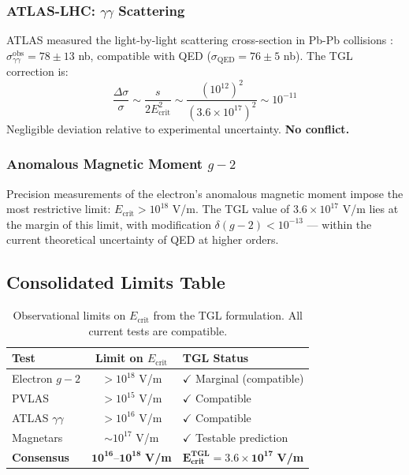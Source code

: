 \documentclass[12pt,a4paper,twoside]{article}
\newcommand{\Ecrit}{E_{\text{crit}}}
\begin{document}
\subsubsection{ATLAS-LHC: $\gamma\gamma$ Scattering}

ATLAS measured the light-by-light scattering cross-section in Pb-Pb collisions \cite{ATLAS2019}: $\sigma_{\gamma\gamma}^{\text{obs}} = 78 \pm 13$ nb, compatible with QED ($\sigma_{\text{QED}} = 76 \pm 5$ nb). The TGL correction is:
\begin{equation}
\frac{\Delta\sigma}{\sigma} \sim \frac{s}{2\Ecrit^2} \sim \frac{(10^{12})^2}{(3.6 \times 10^{17})^2} \sim 10^{-11}
\label{eq:atlas_correction}
\end{equation}
Negligible deviation relative to experimental uncertainty. \textbf{No conflict.}

\subsubsection{Anomalous Magnetic Moment $g-2$}

Precision measurements of the electron's anomalous magnetic moment impose the most restrictive limit: $\Ecrit > 10^{18}$ V/m. The TGL value of $3.6 \times 10^{17}$ V/m lies at the margin of this limit, with modification $\delta(g-2) < 10^{-13}$ --- within the current theoretical uncertainty of QED at higher orders.

\subsection{Consolidated Limits Table}

\begin{table}[H]
\centering
\caption{Observational limits on $\Ecrit$ from the TGL formulation. All current tests are compatible.}
\label{tab:limits}
\begin{tabular}{lcl}
\toprule
\textbf{Test} & \textbf{Limit on $\Ecrit$} & \textbf{TGL Status} \\
\midrule
Electron $g-2$ & $> 10^{18}$ V/m & $\checkmark$ Marginal (compatible) \\
PVLAS & $> 10^{15}$ V/m & $\checkmark$ Compatible \\
ATLAS $\gamma\gamma$ & $> 10^{16}$ V/m & $\checkmark$ Compatible \\
Magnetars & $\sim 10^{17}$ V/m & $\checkmark$ Testable prediction \\
\midrule
\textbf{Consensus} & $\mathbf{10^{16}\text{--}10^{18}}$ \textbf{V/m} & $\mathbf{\Ecrit^{\text{TGL}} = 3.6 \times 10^{17}}$ \textbf{V/m} \\
\bottomrule
\end{tabular}
\end{table}
\end{document}
